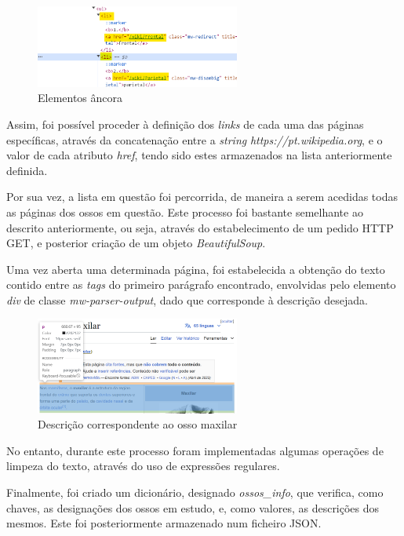 \begin{figure}[H]
    \centering
    \centering
    \includegraphics[width=0.6\textwidth]{Images/web1.png}
    \caption{Elementos âncora}
    \label{fig:dic-traduc1}
\end{figure}

Assim, foi possível proceder à definição dos \textit{links} de cada uma das páginas específicas, através da concatenação entre a \textit{string} \textit{https://pt.wikipedia.org}, e o valor de cada atributo \textit{href}, tendo sido estes armazenados na lista anteriormente definida.

Por sua vez, a lista em questão foi percorrida, de maneira a serem acedidas todas as páginas dos ossos em questão. Este processo foi bastante semelhante ao descrito anteriormente, ou seja, através do estabelecimento de um pedido HTTP GET, e posterior criação de um objeto \textit{BeautifulSoup}.

Uma vez aberta uma determinada página, foi estabelecida a obtenção do texto contido entre as \textit{tags} do primeiro parágrafo encontrado, envolvidas pelo elemento \textit{div} de classe \textit{mw-parser-output}, dado que corresponde à descrição desejada.

\begin{figure}[H]
    \centering
    \centering
    \includegraphics[width=0.6\textwidth]{Images/web2.png}
    \caption{Descrição correspondente ao osso maxilar \cite{wikipedia2024maxilar}}
    \label{fig:dic-traduc1}
\end{figure}

No entanto, durante este processo foram implementadas algumas operações de limpeza do texto, através do uso de expressões regulares.

Finalmente, foi criado um dicionário, designado \textit{ossos\_info}, que verifica, como chaves, as designações dos ossos em estudo, e, como valores, as descrições dos mesmos. Este foi posteriormente armazenado num ficheiro JSON.

